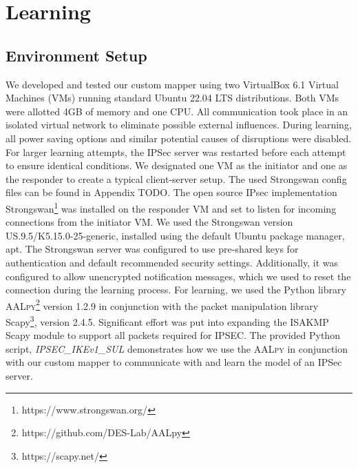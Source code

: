 %
%
% 
% 
% 

\chapter{Learning}

\label{chap:Learning}

\section{Environment Setup} \label{subsec:environment}
We developed and tested our custom mapper using two VirtualBox 6.1 Virtual Machines (VMs) running standard Ubuntu 22.04 LTS distributions. Both VMs were allotted 4GB of memory and one CPU. All communication took place in an isolated virtual network to eliminate possible external influences. During learning, all power saving options and similar potential causes of disruptions were disabled. For larger learning attempts, the IPSec server was restarted before each attempt to ensure identical conditions. We designated one VM as the initiator and one as the responder to create a typical client-server setup. The used Strongswan config files can be found in Appendix TODO. The open source IPsec implementation Strongswan\footnote{https://www.strongswan.org/} was installed on the responder VM and set to listen for incoming connections from the initiator VM. We used the Strongswan version US.9.5/K5.15.0-25-generic, installed using the default Ubuntu package manager, apt. The Strongswan server was configured to use pre-shared keys for authentication and default recommended security settings. Additionally, it was configured to allow unencrypted notification messages, which we used to reset the connection during the learning process. For learning, we used the Python library \textsc{AALpy}\footnote{https://github.com/DES-Lab/AALpy} version 1.2.9 in conjunction with the packet manipulation library Scapy\footnote{https://scapy.net/}, version 2.4.5. Significant effort was put into expanding the ISAKMP Scapy module to support all packets required for IPSEC. The provided Python script, \emph{IPSEC\_IKEv1\_SUL} demonstrates how we use the \textsc{AALpy} in conjunction with our custom mapper to communicate with and learn the model of an IPSec server.

